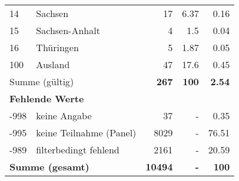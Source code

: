 \begin{longtable}{lXrrr}
     14 &
     \multicolumn{1}{X}{ Sachsen   } &


       \num{17} &
       \num[round-mode=places,round-precision=2]{6.37} &
         \num[round-mode=places,round-precision=2]{0.16} \\

     15 &
     \multicolumn{1}{X}{ Sachsen-Anhalt   } &


       \num{4} &
       \num[round-mode=places,round-precision=2]{1.5} &
         \num[round-mode=places,round-precision=2]{0.04} \\

     16 &
     \multicolumn{1}{X}{ Thüringen   } &


       \num{5} &
       \num[round-mode=places,round-precision=2]{1.87} &
         \num[round-mode=places,round-precision=2]{0.05} \\

     100 &
     \multicolumn{1}{X}{ Ausland   } &


       \num{47} &
       \num[round-mode=places,round-precision=2]{17.6} &
         \num[round-mode=places,round-precision=2]{0.45} \\
     \midrule
     \multicolumn{2}{l}{Summe (gültig)} &
       \textbf{\num{267}} &
     \textbf{\num{100}} &
       \textbf{\num[round-mode=places,round-precision=2]{2.54}} \\
     \multicolumn{5}{l}{\textbf{Fehlende Werte}}\\
       -998 &
       keine Angabe &
         \num{37} &
        - &
         \num[round-mode=places,round-precision=2]{0.35} \\
       -995 &
       keine Teilnahme (Panel) &
         \num{8029} &
        - &
         \num[round-mode=places,round-precision=2]{76.51} \\
       -989 &
       filterbedingt fehlend &
         \num{2161} &
        - &
         \num[round-mode=places,round-precision=2]{20.59} \\
     \midrule
     \multicolumn{2}{l}{\textbf{Summe (gesamt)}} &
          \textbf{\num{10494}} &
        \textbf{-} &
        \textbf{\num{100}} \\
     \bottomrule
     \end{longtable}
     
